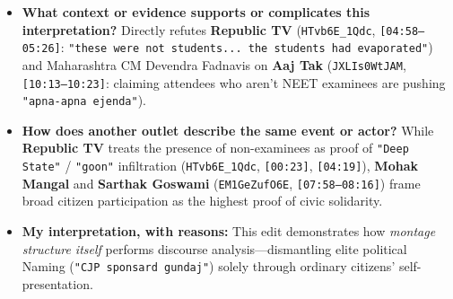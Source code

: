\documentclass[10pt,a4paper]{article}
\begin{document}
\begin{itemize}[leftmargin=1.5em, itemsep=3pt, topsep=4pt]
  \item \textbf{What context or evidence supports or complicates this interpretation?} Directly refutes \textbf{Republic TV} (\texttt{HTvb6E\_1Qdc}, \texttt{[04:58--05:26]}: \texttt{"these were not students... the students had evaporated"}) and Maharashtra CM Devendra Fadnavis on \textbf{Aaj Tak} (\texttt{JXLIs0WtJAM}, \texttt{[10:13--10:23]}: claiming attendees who aren't NEET examinees are pushing \texttt{"apna-apna ejenda"}).
  \item \textbf{How does another outlet describe the same event or actor?} While \textbf{Republic TV} treats the presence of non-examinees as proof of \texttt{"Deep State"} / \texttt{"goon"} infiltration (\texttt{HTvb6E\_1Qdc}, \texttt{[00:23]}, \texttt{[04:19]}), \textbf{Mohak Mangal} and \textbf{Sarthak Goswami} (\texttt{EM1GeZufO6E}, \texttt{[07:58--08:16]}) frame broad citizen participation as the highest proof of civic solidarity.
  \item \textbf{My interpretation, with reasons:} This edit demonstrates how \textit{montage structure itself} performs discourse analysis---dismantling elite political Naming (\texttt{"CJP sponsard gundaj"}) solely through ordinary citizens' self-presentation.
\end{itemize}
\end{document}
